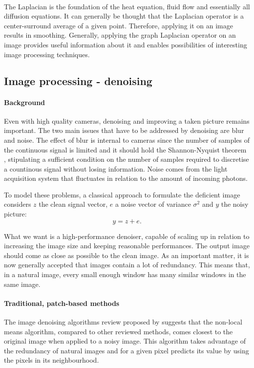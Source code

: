 \paragraph{}
The Laplacian is the foundation of the heat equation, fluid flow and essentially all diffusion equations.
It can generally be thought that the Laplacian operator is a center-surround average \cite{siam_slides_2016} of a given point.
Therefore, applying it on an image results in smoothing.
Generally, applying the graph Laplacian operator on an image provides useful information about it and enables possibilities of interesting image processing techniques.

\subsection{Image processing - denoising}

\paragraph{Background}
Even with high quality cameras, denoising and improving a taken picture remains important.
The two main issues that have to be addressed by denoising are blur and noise.
The effect of blur is internal to cameras since the number of samples of the continuous signal is limited and it should hold the Shannon-Nyquist theorem \cite{buades_review_2005}, stipulating a sufficient condition on the number of samples required to discretise a countinous signal without losing information.
Noise comes from the light acquisition system that fluctuates in relation to the amount of incoming photons.

To model these problems, a classical approach to formulate the deficient image considers \(z\) the clean signal vector, \(e\) a noise vector of variance \(\sigma^2\) and \(y\) the noisy picture:
\[y = z + e.\]

What we want is a high-performance denoiser, capable of scaling up in relation to increasing the image size and keeping reasonable performances.
The output image should come as close as possible to the clean image.
As an important matter, it is now generally accepted that images contain a lot of redundancy.
This means that, in a natural image, every small enough window has many similar windows in the same image.

\paragraph{Traditional, patch-based methods}
The image denoising algorithms review proposed by \cite{buades_review_2005} suggests that the non-local means algorithm, compared to other reviewed methods, comes closest to the original image when applied to a noisy image.
This algorithm takes advantage of the redundancy of natural images and for a given pixel predicts its value by using the pixels in its neighbourhood.

